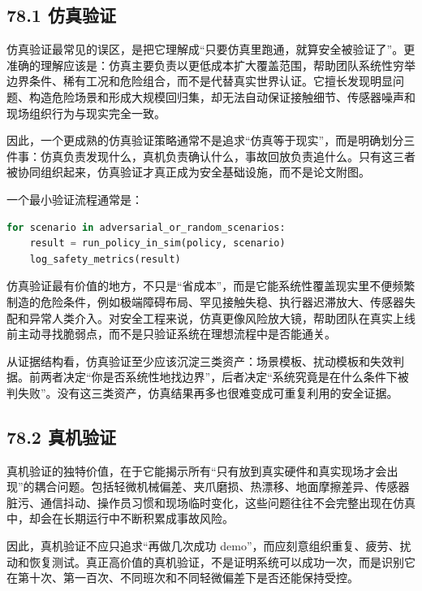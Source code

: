 \subsection*{78.1 仿真验证}


仿真验证最常见的误区，是把它理解成“只要仿真里跑通，就算安全被验证了”。更准确的理解应该是：仿真主要负责以更低成本扩大覆盖范围，帮助团队系统性穷举边界条件、稀有工况和危险组合，而不是代替真实世界认证。它擅长发现明显问题、构造危险场景和形成大规模回归集，却无法自动保证接触细节、传感器噪声和现场组织行为与现实完全一致。

因此，一个更成熟的仿真验证策略通常不是追求“仿真等于现实”，而是明确划分三件事：仿真负责发现什么，真机负责确认什么，事故回放负责追什么。只有这三者被协同组织起来，仿真验证才真正成为安全基础设施，而不是论文附图。

一个最小验证流程通常是：

\begin{lstlisting}[language=python]
for scenario in adversarial_or_random_scenarios:
    result = run_policy_in_sim(policy, scenario)
    log_safety_metrics(result)
\end{lstlisting}

仿真验证最有价值的地方，不只是“省成本”，而是它能系统性覆盖现实里不便频繁制造的危险条件，例如极端障碍布局、罕见接触失稳、执行器迟滞放大、传感器失配和异常人类介入。对安全工程来说，仿真更像风险放大镜，帮助团队在真实上线前主动寻找脆弱点，而不是只验证系统在理想流程中是否能通关。

从证据结构看，仿真验证至少应该沉淀三类资产：场景模板、扰动模板和失效判据。前两者决定“你是否系统性地找边界”，后者决定“系统究竟是在什么条件下被判失败”。没有这三类资产，仿真结果再多也很难变成可重复利用的安全证据。

\subsection*{78.2 真机验证}


真机验证的独特价值，在于它能揭示所有“只有放到真实硬件和真实现场才会出现”的耦合问题。包括轻微机械偏差、夹爪磨损、热漂移、地面摩擦差异、传感器脏污、通信抖动、操作员习惯和现场临时变化，这些问题往往不会完整出现在仿真中，却会在长期运行中不断积累成事故风险。

因此，真机验证不应只追求“再做几次成功 demo”，而应刻意组织重复、疲劳、扰动和恢复测试。真正高价值的真机验证，不是证明系统可以成功一次，而是识别它在第十次、第一百次、不同班次和不同轻微偏差下是否还能保持受控。

